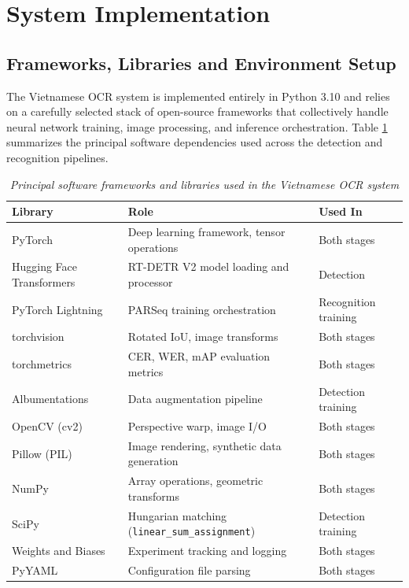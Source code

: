 \section{System Implementation}
\subsection{Frameworks, Libraries and Environment Setup}
The Vietnamese OCR system is implemented entirely in Python 3.10 and relies on a carefully selected stack of open-source frameworks that collectively handle neural network training, image processing, and inference orchestration. Table \ref{tab:frameworks} summarizes the principal software dependencies used across the detection and recognition pipelines.

\begin{table}[ht]
\centering
\scriptsize
\caption[Principal software frameworks and libraries used in the Vietnamese OCR system]{\textit{Principal software frameworks and libraries used in the Vietnamese OCR system}}
\label{tab:frameworks}
\begin{tabular}{lll}
\hline
\textbf{Library} & \textbf{Role} & \textbf{Used In} \\
\hline
PyTorch & Deep learning framework, tensor operations & Both stages \\
Hugging Face Transformers & RT-DETR V2 model loading and processor & Detection \\
PyTorch Lightning & PARSeq training orchestration & Recognition training \\
torchvision & Rotated IoU, image transforms & Both stages \\
torchmetrics & CER, WER, mAP evaluation metrics & Both stages \\
Albumentations & Data augmentation pipeline & Detection training \\
OpenCV (cv2) & Perspective warp, image I/O & Both stages \\
Pillow (PIL) & Image rendering, synthetic data generation & Both stages \\
NumPy & Array operations, geometric transforms & Both stages \\
SciPy & Hungarian matching (\texttt{linear\_sum\_assignment}) & Detection training \\
Weights and Biases & Experiment tracking and logging & Both stages \\
PyYAML & Configuration file parsing & Both stages \\
\hline
\end{tabular}
\end{table}

